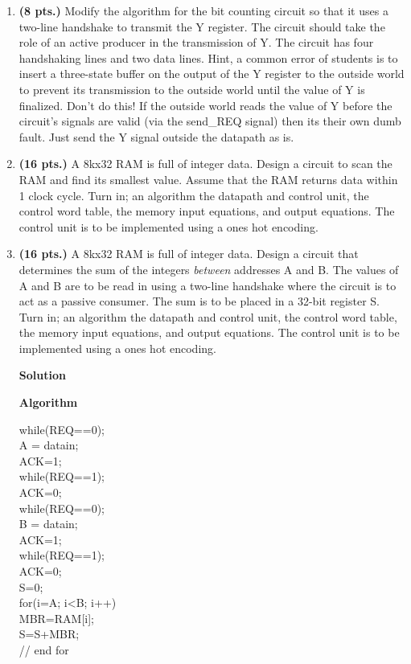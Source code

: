 \begin{enumerate}
\item \textbf{ (8 pts.)}
Modify the algorithm for the bit counting circuit so that it uses a 
two-line handshake to transmit the Y register.  The circuit should take
the role of an active producer in the transmission of Y.  The circuit
has four handshaking lines and two data lines.  Hint, a common
error of students is to insert a three-state buffer on the output of
the Y register to the outside world to prevent its transmission to
the outside world until the value of Y is finalized.  Don't do this!
If the outside world reads the value of Y before the circuit's signals
are valid (via the send\_REQ signal) then its their own dumb fault.
Just send the Y signal outside the datapath as is.

\item \textbf{ (16 pts.)} 
A 8kx32 RAM is full of integer data.  Design a circuit to scan
the RAM and find its smallest value.  Assume that the RAM 
returns data within 1 clock cycle.  
Turn in; an algorithm
the datapath and control unit,
the control word table,
the memory input equations, and
output equations.  
The control unit is to be implemented using a ones hot encoding.


\item \textbf{ (16 pts.)}
A 8kx32 RAM is full of integer data.  Design a
circuit that determines the sum of the integers {\em between} addresses
A and B.  The values of A and B are to be read in using a two-line
handshake where the circuit is to act as a passive consumer.  
The sum is to be placed in a 32-bit register S.
Turn in; an algorithm
the datapath and control unit,
the control word table,
the memory input equations, and
output equations.  
The control unit is to be implemented using a ones hot encoding.

\begin{onlysolution}  \textbf{Solution} \itshape{

\textbf{ Algorithm}

while(REQ==0); \\
A = datain; \\
ACK=1; \\
while(REQ==1); \\
ACK=0; \\
while(REQ==0); \\
B = datain; \\
ACK=1; \\
while(REQ==1); \\
ACK=0; \\
S=0; \\
for(i=A; i<B; i++)  { \\
 MBR=RAM[i]; \\
 S=S+MBR; \\
} // end for \\

}
\end{onlysolution}
\end{enumerate}

